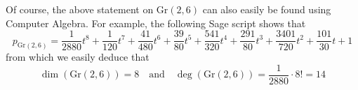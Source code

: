 \documentclass{scrartcl}
\newcommand{\Gr}{\mathrm{Gr}}
\theoremstyle{definition}
\begin{document}
Of course, the above statement on $\Gr(2, 6)$ can also easily be found using Computer Algebra.
For example, the following Sage script shows that
\begin{equation*}
    p_{\Gr(2, 6)} = \frac 1 {2880} t^8 + \frac 1 {120} t^7 + \frac {41} {480} t^6 + \frac {39} {80} t^5 + \frac {541} {320} t^4 + \frac {291} {80} t^3 + \frac {3401} {720} t^2 + \frac {101} {30} t + 1
\end{equation*}
from which we easily deduce that
\begin{equation*}
    \dim(\Gr(2, 6)) = 8 \quad \text{and} \quad \deg(\Gr(2, 6)) = \frac 1 {2880} \cdot 8! = 14
\end{equation*}

\printbibliography
\end{document}
